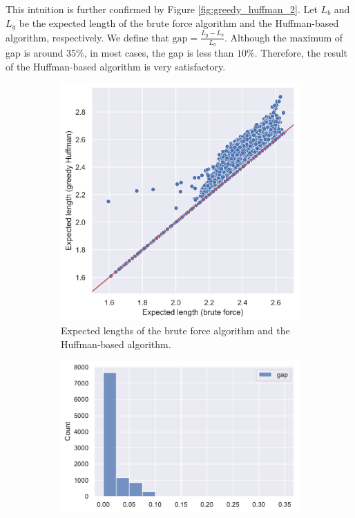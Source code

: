This intuition is further confirmed by Figure \ref{fig:greedy_huffman_2}. Let $L_b$ and $L_g$ be the expected length of the brute force algorithm and the Huffman-based algorithm, respectively. We define that $\text{gap} = \frac{L_g-L_b}{L_b}$. Although the maximum of gap is around $35\%$, in most cases, the gap is less than $10\%$. Therefore, the result of the Huffman-based algorithm is very satisfactory.

\begin{figure}[H]
    
    \centering
    
    \begin{subfigure}{0.45\textwidth}
        \includegraphics[width=1.0\textwidth]{figure/greedy_huffman_fig1.png}
        \caption{Expected lengths of the brute force algorithm and the Huffman-based algorithm.}
    \label{fig:greedy_huffman_1}
    \end{subfigure}
    \begin{subfigure}{0.45\textwidth}
    \includegraphics[width=1.2\textwidth]{figure/greedy_huffman_fig2.pdf}

\end{subfigure}
\end{figure}
